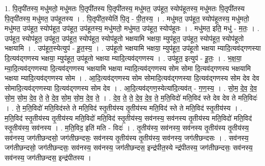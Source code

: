 \documentclass[17pt]{extarticle}
\begin{document}
1. पि॒तृपी॑तस्य॒ मधु॑मतो॒ मधु॑मतः पि॒तृपी॑तस्य पि॒तृपी॑तस्य॒ मधु॑मत॒ उप॑हूत॒ स्योप॑हूतस्य॒ मधु॑मतः पि॒तृपी॑तस्य पि॒तृपी॑तस्य॒ मधु॑मत॒ उप॑हूतस्य । . पि॒तृपी॑त॒स्येति॑ पि॒तृ - पी॒त॒स्य॒ । . मधु॑मत॒ उप॑हूत॒ स्योप॑हूतस्य॒ मधु॑मतो॒ मधु॑मत॒ उप॑हूत॒ स्योप॑हूत॒ उप॑हूत॒ उप॑हूतस्य॒ मधु॑मतो॒ मधु॑मत॒ उप॑हूत॒ स्योप॑हूतः । . मधु॑मत॒ इति॒ मधु॑ - म॒तः॒ । . उप॑हूत॒ स्योप॑हूत॒ उप॑हूत॒ उप॑हूत॒ स्योप॑हूत॒ स्योप॑हूतो भक्षयामि भक्षया॒ म्युप॑हूत॒ उप॑हूत॒ स्योप॑हूत॒ स्योप॑हूतो भक्षयामि । . उप॑हूत॒स्येत्युप॑ - हू॒त॒स्य॒ । . उप॑हूतो भक्षयामि भक्षया॒ म्युप॑हूत॒ उप॑हूतो भक्षया म्यादि॒त्यव॑द्‍गणस्या दि॒त्यव॑द्‍गणस्य भक्षया॒ म्युप॑हूत॒ उप॑हूतो भक्षया म्यादि॒त्यव॑द्‍गणस्य । . उप॑हूत॒ इत्युप॑ - हू॒तः॒ । . भ॒क्ष॒या॒ म्या॒दि॒त्यव॑द्‍गणस्या दि॒त्यव॑द्‍गणस्य भक्षयामि भक्षया म्यादि॒त्यव॑द्‍गणस्य सोम सोमा दि॒त्यव॑द्‍गणस्य भक्षयामि भक्षया म्यादि॒त्यव॑द्‍गणस्य सोम । . आ॒दि॒त्यव॑द्‍गणस्य सोम सोमादि॒त्यव॑द्‍गणस्या दि॒त्यव॑द्‍गणस्य सोम देव देव सोमादि॒त्यव॑द्‍गणस्या दि॒त्यव॑द्‍गणस्य सोम देव । . आ॒दि॒त्यव॑द्‍गण॒स्येत्या॑दि॒त्यव॑त् - ग॒ण॒स्य॒ । . सो॒म॒ दे॒व॒ दे॒व॒ सो॒म॒ सो॒म॒ दे॒व॒ ते॒ ते॒ दे॒व॒ सो॒म॒ सो॒म॒ दे॒व॒ ते॒ । . दे॒व॒ ते॒ ते॒ दे॒व॒ दे॒व॒ ते॒ म॒ति॒विदो॑ मति॒विद॑ स्ते देव देव ते मति॒विदः॑ । . ते॒ म॒ति॒विदो॑ मति॒विद॑स्ते ते मति॒विद॑ स्तृ॒तीय॑स्य तृ॒तीय॑स्य मति॒विद॑ स्ते ते मति॒विद॑ स्तृ॒तीय॑स्य । . म॒ति॒विद॑ स्तृ॒तीय॑स्य तृ॒तीय॑स्य मति॒विदो॑ मति॒विद॑ स्तृ॒तीय॑स्य॒ सव॑नस्य॒ सव॑नस्य तृ॒तीय॑स्य मति॒विदो॑ मति॒विद॑ स्तृ॒तीय॑स्य॒ सव॑नस्य । . म॒ति॒विद॒ इति॑ मति - विदः॑ । . तृ॒तीय॑स्य॒ सव॑नस्य॒ सव॑नस्य तृ॒तीय॑स्य तृ॒तीय॑स्य॒ सव॑नस्य॒ जग॑तीछन्दसो॒ जग॑तीछन्दसः॒ सव॑नस्य तृ॒तीय॑स्य तृ॒तीय॑स्य॒ सव॑नस्य॒ जग॑तीछन्दसः । . सव॑नस्य॒ जग॑तीछन्दसो॒ जग॑तीछन्दसः॒ सव॑नस्य॒ सव॑नस्य॒ जग॑तीछन्दस॒ इन्द्र॑पीत॒स्ये न्द्र॑पीतस्य॒ जग॑तीछन्दसः॒ सव॑नस्य॒ सव॑नस्य॒ जग॑तीछन्दस॒ इन्द्र॑पीतस्य । \newline
\end{document}
